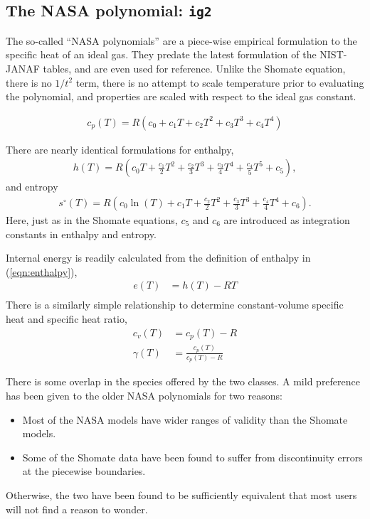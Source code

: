 \subsection{The NASA polynomial: \texttt{ig2}}

The so-called ``NASA polynomials'' are a piece-wise empirical formulation to the specific heat of an ideal gas.  They predate the latest formulation of the NIST-JANAF tables, and are even used for reference.  Unlike the Shomate equation, there is no $1/t^2$ term, there is no attempt to scale temperature prior to evaluating the polynomial, and properties are scaled with respect to the ideal gas constant.

\begin{align}
c_p(T) = R\left(c_0 + c_1 T + c_2 T^2 + c_3 T^3 + c_4 T^4\right)
\end{align}

There are nearly identical formulations for enthalpy,
\begin{align}
h(T) = R \left(c_0 T + \frac{c_1}{2} T^2 + \frac{c_2}{3} T^3 + \frac{c_3}{4} T^4 + \frac{c_4}{5}T^5 + c_5 \right),
\end{align}
and entropy
\begin{align}
s^\circ(T) = R \left(c_0 \ln(T) + c_1 T + \frac{c_2}{2} T^2 + \frac{c_3}{3} T^3 + \frac{c_4}{4} T^4 + c_6\right).
\end{align}
Here, just as in the Shomate equations, $c_5$ and $c_6$ are introduced as integration constants in enthalpy and entropy.

Internal energy is readily calculated from the definition of enthalpy in (\ref{eqn:enthalpy}),
\begin{align}
e(T) &= h(T) - RT\nonumber\\
\end{align}
There is a similarly simple relationship to determine constant-volume specific heat and specific heat ratio,
\begin{align}
c_v(T) &= c_p(T) - R\\
\gamma(T) &= \frac{c_p(T)}{c_p(T)-R}
\end{align}

There is some overlap in the species offered by the two classes.  A mild preference has been given to the older NASA polynomials for two reasons:
\begin{itemize}
\item Most of the NASA models have wider ranges of validity than the Shomate models.
\item Some of the Shomate data have been found to suffer from discontinuity errors at the piecewise boundaries.
\end{itemize}
Otherwise, the two have been found to be sufficiently equivalent that most users will not find a reason to wonder.

